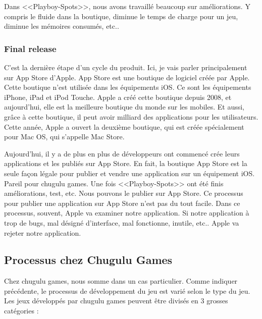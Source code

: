 Dans <<Playboy-Spots>>, nous avons travaillé beaucoup sur améliorations. Y compris le fluide dans la boutique, diminue le temps de charge pour un jeu, diminue les mémoires consumés, etc.. 


\subsubsection{Final release} %
\label{ssub:final_release}

C'est la dernière étape d'un cycle du produit. Ici, je vais parler principalement sur App Store d'Apple. App Store est une boutique de logiciel créée par Apple. Cette boutique n'est utilisée dans les équipements iOS. Ce sont les équipements iPhone, iPad et iPod Touche. Apple a créé cette boutique depuis 2008, et aujourd'hui, elle est la meilleure boutique du monde sur les mobiles. Et aussi, grâce à cette boutique, il peut avoir milliard des applications pour les utilisateurs. Cette année, Apple a ouvert la deuxième boutique, qui est créée spécialement pour Mac OS, qui s'appelle Mac Store. 

Aujourd'hui, il y a de plus en plus de développeurs ont commencé crée leurs applications et les publiés sur App Store. En fait, la boutique App Store est la seule façon légale pour publier et vendre une application sur un équipement iOS. Pareil pour chugulu games. Une fois <<Playboy-Spots>> ont été finis améliorations, test, etc. Nous pouvons le publier sur App Store. Ce processus pour publier une application sur App Store n'est pas du tout facile. Dans ce processus, souvent, Apple va examiner notre application. Si notre application à trop de bugs, mal désigné d'interface, mal fonctionne, inutile, etc.. Apple va rejeter notre application.




\subsection{Processus chez Chugulu Games} %
\label{sub:processus_chez_chugulu_games}

Chez chugulu games, nous somme dans un cas particulier. Comme indiquer précédente, le processus de développement du jeu est varié selon le type du jeu. Les jeux développés par chugulu games peuvent être divisés en 3 grosses catégories : 

